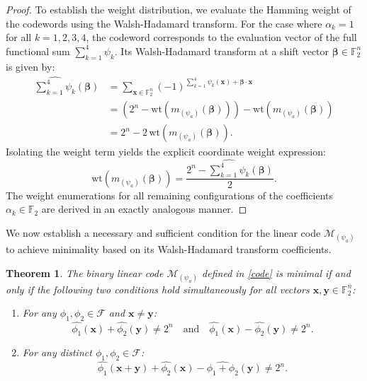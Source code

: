 \documentclass[pdflatex,sn-mathphys-num]{sn-jnl}%
\theoremstyle{thmstyleone}%
\newtheorem{theorem}{Theorem}%
\theoremstyle{thmstyletwo}%
\theoremstyle{thmstylethree}%
\begin{document}
\begin{proof}
To establish the weight distribution, we evaluate the Hamming weight of the codewords using the Walsh-Hadamard transform. For the case where $\alpha_k = 1$ for all $k = 1,2,3,4$, the codeword corresponds to the evaluation vector of the full functional sum $\sum_{k=1}^{4} \psi_k$. Its Walsh-Hadamard transform at a shift vector $\mathbf{\beta} \in \mathbb{F}_2^n$ is given by:
\begin{align*}
\widehat{\sum_{k=1}^{4} \psi_k}(\mathbf{\beta}) 
&= \sum_{\mathbf{x} \in \mathbb{F}_2^n} (-1)^{\sum_{k=1}^{4} \psi_k(\mathbf{x}) + \mathbf{\beta} \cdot \mathbf{x}} \\
&= \left(2^n - \mathrm{wt}(m_{(\psi_a)}(\mathbf{\beta}))\right) - \mathrm{wt}(m_{(\psi_a)}(\mathbf{\beta})) \\
&= 2^n - 2\,\mathrm{wt}(m_{(\psi_a)}(\mathbf{\beta})).
\end{align*}
Isolating the weight term yields the explicit coordinate weight expression:
\[
\mathrm{wt}(m_{(\psi_a)}(\mathbf{\beta})) = \frac{2^n - \widehat{\sum_{k=1}^{4} \psi_k}(\mathbf{\beta})}{2}.
\]
The weight enumerations for all remaining configurations of the coefficients $\alpha_k \in \mathbb{F}_2$ are derived in an exactly analogous manner.
\end{proof}

We now establish a necessary and sufficient condition for the linear code $\mathcal{M}_{(\psi_a)}$ to achieve minimality based on its Walsh-Hadamard transform coefficients.
\begin{theorem}\label{Thm_Minimal_Cond}
The binary linear code $\mathcal{M}_{(\psi_a)}$ defined in \eqref{code} is minimal if and only if the following two conditions hold simultaneously for all vectors $\mathbf{x},\mathbf{y} \in \mathbb{F}_2^n$:
\begin{enumerate}
    \item For any $\phi_1,\phi_2 \in \mathcal{F}$ and $\mathbf{x} \neq \mathbf{y}$:
    \[ \widehat{\phi_1}(\mathbf{x})+\widehat{\phi_2}(\mathbf{y})\neq 2^n \quad \text{and} \quad \widehat{\phi_1}(\mathbf{x})-\widehat{\phi_2}(\mathbf{y})\neq 2^n. \tag{2.3} \]
    \item For any distinct $\phi_1,\phi_2 \in \mathcal{F}$:
    \[ \widehat{\phi_1}(\mathbf{x}+\mathbf{y})+\widehat{\phi_2}(\mathbf{x})-\widehat{\phi_1+\phi_2}(\mathbf{y})\neq 2^n. \tag{2.4} \]
\end{enumerate}
\end{theorem}
\end{document}
